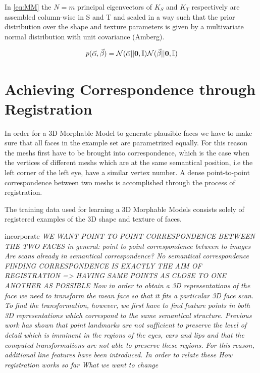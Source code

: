 In \eqref{eq:MM} the $N=m$ principal eigenvectors of $K_{S}$ and $K_{T}$ respectively are assembled column-wise in S and T and scaled in a way such that the prior distribution over the shape and texture parameters is given by a multivariate normal distribution with unit covariance (Amberg).

\begin{equation}
    p(\vec\alpha, \vec\beta) = \mathcal{N}(\vec\alpha\vert|\textbf{0}, \mathbb{I})\mathcal{N}(\vec\beta\vert|\textbf{0}, \mathbb{I})
\end{equation}

\section{Achieving Correspondence through Registration}
In order for a 3D Morphable Model to generate plausible faces we have to make sure that all faces in the example set are parametrized equally. For this reason the meshs first have to be brought into correspondence, which is the case when the vertices of different meshs which are at the same semantical position, i.e the left corner of the left eye, have a similar vertex number. A dense point-to-point correspondence between two meshs is accomplished through the process of registration.  

The training data used for learning a 3D Morphable Models consists solely of registered examples of the 3D shape and texture of faces.

incorporate
\textit{WE WANT POINT TO POINT CORRESPONDENCE BETWEEN THE TWO FACES
in general: point to point correspondence between to images
Are scans already in semantical correspondence? No semantical correspondence
FINDING CORRESPONDENCE IS EXACTLY THE AIM OF REGISTRATION => HAVING SAME POINTS AS CLOSE TO ONE ANOTHER AS POSSIBLE
Now in order to obtain a 3D representations of the face we need to transform the mean face so that it fits a particular 3D face scan. To find the transformation, however, we first have to find feature points in both 3D representations which correspond to the same semantical structure. Previous work has shown that point landmarks are not sufficient to preserve the level of detail which is imminent in the regions of the eyes, ears and lips and that the computed transformations are not able to preserve these regions. For this reason, additional line features have been introduced. In order to relate these 
How registration works so far
What we want to change}

